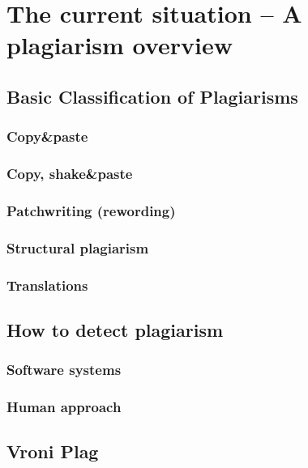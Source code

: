 \chapter{The current situation -- A plagiarism overview}\label{chap:plagOverview}

\section{Basic Classification of Plagiarisms}

\subsection{Copy\&paste}
\subsection{Copy, shake\&paste}
\subsection{Patchwriting (rewording)}
\subsection{Structural plagiarism}
\subsection{Translations}

\section{How to detect plagiarism}
\subsection{Software systems}
\subsection{Human approach}

\section{Vroni Plag}
